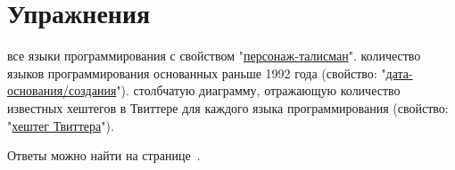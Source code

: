 \section{Упражнения}
\label{prog_lang_test}
\begin{enumerate}
	 все языки программирования с свойством "\href{https://www.wikidata.org/wiki/Property:P822}{персонаж-талисман}".
	 количество языков программирования основанных раньше 1992 года (свойство: "\href{https://www.wikidata.org/wiki/Property:P571}{дата-основания/создания}").
	 столбчатую диаграмму, отражающую количество известных хештегов в Твиттере для каждого языка программирования (свойство: "\href{https://www.wikidata.org/wiki/Property:P2572}{хештег Твиттера}").
\end{enumerate}

Ответы можно найти на странице~\pageref{answer:prog_langs_4}.